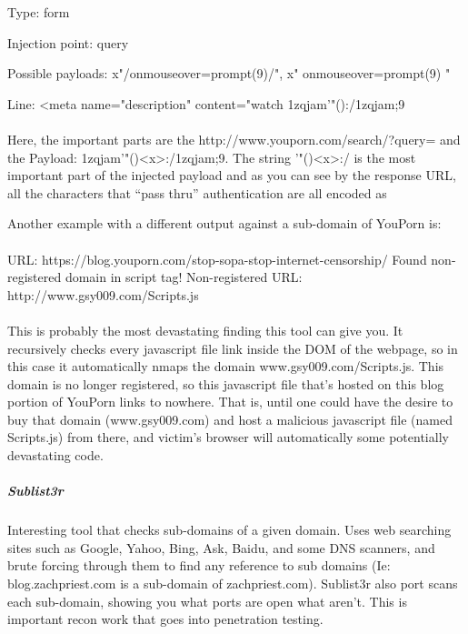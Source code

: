 Type: form

Injection point: query

Possible payloads: x"/onmouseover=prompt(9)/", x" onmouseover=prompt(9) "

Line: <meta name="description" content="watch 1zqjam'"(){}:/1zqjam;9

\paragraph{}
Here, the important parts are the http://www.youporn.com/search/?query=  and the
Payload: 1zqjam'"(){}<x>:/1zqjam;9.  The string '"(){}<x>:/ is the most important part of the injected payload and as you can see by the response URL, all the characters that “pass thru” authentication are all encoded as %

Another example with a different output against a sub-domain of YouPorn is:
\paragraph{}
URL: https://blog.youporn.com/stop-sopa-stop-internet-censorship/
Found non-registered domain in script tag! Non-registered URL: http://www.gsy009.com/Scripts.js
\paragraph{}
This is probably the most devastating finding this tool can give you.  It recursively checks every javascript file link inside the DOM of the webpage, so in this case it automatically nmaps the domain www.gsy009.com/Scripts.js.  This domain is no longer registered, so this javascript file that's hosted on this blog portion of YouPorn links to nowhere.  That is, until one could have the desire to buy that domain (www.gsy009.com) and host a malicious javascript file (named Scripts.js) from there, and victim's browser will automatically some potentially devastating code.

\subparagraph{Sublist3r}
Interesting tool that checks sub-domains of a given domain. Uses web searching sites such as Google, Yahoo, Bing, Ask, Baidu, and some DNS scanners, and brute forcing through them to find any reference to sub domains (Ie: blog.zachpriest.com is a sub-domain of zachpriest.com).
Sublist3r also port scans each sub-domain, showing you what ports are open what aren’t.  This is important recon work that goes into penetration testing.

